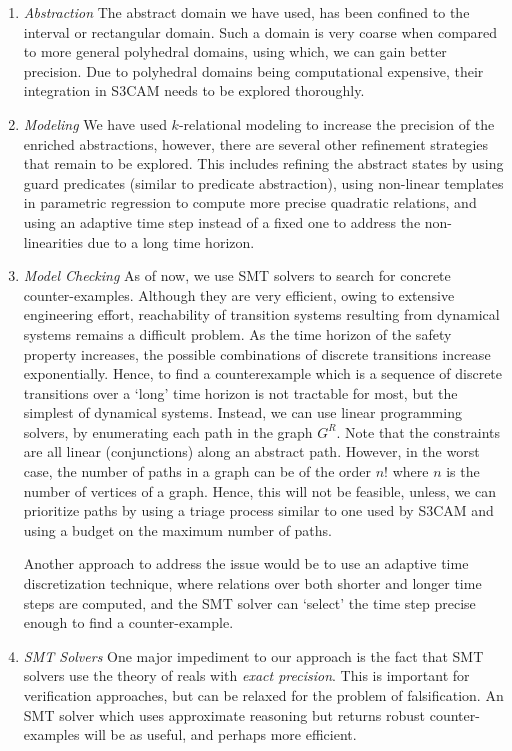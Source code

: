 \begin{enumerate}

\item \emph{Abstraction} The abstract domain we have used, has been
    confined to the interval or rectangular domain. Such a domain is
    very coarse when compared to more general polyhedral domains, using
    which, we can gain better precision. Due to polyhedral domains
    being computational expensive, their integration in S3CAM needs to
    be explored thoroughly.

\item \emph{Modeling} We have used $k$-relational modeling to increase
    the precision of the enriched abstractions, however, there are
    several other refinement strategies that remain to be explored.
    This includes refining the abstract states by using guard
    predicates (similar to predicate abstraction), using non-linear
    templates in parametric regression to compute more precise
    quadratic relations, and using an adaptive time step instead of a
    fixed one to address the non-linearities due to a long time
    horizon.

\item \emph{Model Checking} As of now, we use SMT solvers to search
    for concrete counter-examples. Although they are very efficient,
    owing to extensive engineering effort, reachability of transition
    systems resulting from dynamical systems remains a difficult
    problem. As the time horizon of the safety property increases, the
    possible combinations of discrete transitions increase
    exponentially. Hence, to find a counterexample which is a sequence
    of discrete transitions over a `long' time horizon is not
    tractable for most, but the simplest of dynamical systems.
    Instead, we can use linear programming solvers, by enumerating
    each path in the graph $G^R$. Note that the constraints are all
    linear (conjunctions) along an abstract path. However, in the
    worst case, the number of paths in a graph can be of the order
    $n!$ where $n$ is the number of vertices of a graph. Hence, this
    will not be feasible, unless, we can prioritize paths by using a
    triage process similar to one used by S3CAM and using a budget on
    the maximum number of paths.

    Another approach to address the issue would be to use an adaptive
    time discretization technique, where relations over both shorter
    and longer time steps are computed, and the SMT solver can
    `select' the time step precise enough to find a counter-example.

\item \emph{SMT Solvers} One major impediment to our approach is the
    fact that SMT solvers use the theory of reals with \emph{exact
    precision}. This is important for verification approaches, but can
    be relaxed for the problem of falsification. An SMT solver which
    uses approximate reasoning but returns robust counter-examples
    will be as useful, and perhaps more efficient.

\end{enumerate}

